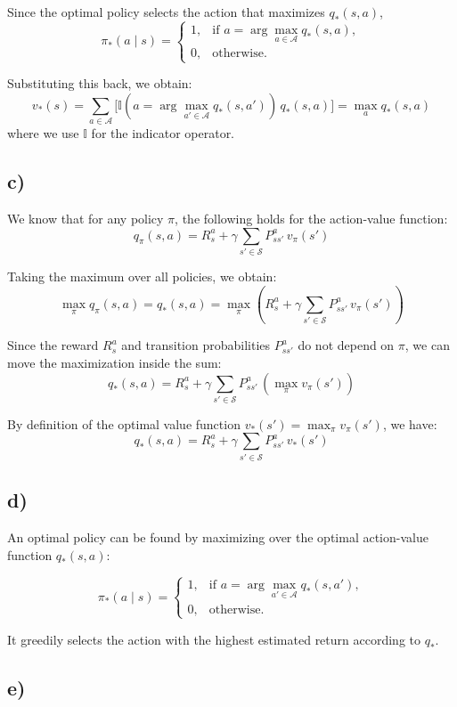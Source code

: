 \documentclass[11pt]{article}
\begin{document}
Since the optimal policy selects the action that maximizes $q_{*}(s,a)$,
\[
\pi_{*}(a \mid s) =
\begin{cases}
1, & \text{if } a = \arg\max\limits_{a \in \mathcal{A}} q_{*}(s,a), \\[4pt]
0, & \text{otherwise.}
\end{cases}
\]

Substituting this back, we obtain:
\[
v_{*}(s)
= \sum_{a \in \mathcal{A}}
\Big[ \mathbb{I}\!\left( a = \arg\max\limits_{a' \in \mathcal{A}} q_{*}(s,a') \right) 
\, q_{*}(s,a)\Big]
= \max_{a} q_{*}(s,a) 
\]
where we use $\mathbb{I}$ for the indicator operator.

\subsection*{c)}
We know that for any policy $\pi$, the following holds for the action-value function:
\[
q_{\pi}(s,a) = R_s^a + \gamma \sum_{s' \in \mathcal{S}} P_{ss'}^a \, v_{\pi}(s')
\]

Taking the maximum over all policies, we obtain:
\[
\max_{\pi} q_{\pi}(s,a) = q_{*}(s,a) = 
\max_{\pi} \left( R_s^a + \gamma \sum_{s' \in \mathcal{S}} P_{ss'}^a \, v_{\pi}(s') \right)
\]

Since the reward $R_s^a$ and transition probabilities $P_{ss'}^a$ do not depend on $\pi$, we can move the maximization inside the sum:
\[
q_{*}(s,a) = R_s^a + \gamma \sum_{s' \in \mathcal{S}} P_{ss'}^a \, \left( \max_{\pi} v_{\pi}(s') \right)
\]

By definition of the optimal value function $v_{*}(s') = \max_{\pi} v_{\pi}(s')$, we have:
\[
\boxed{
q_{*}(s,a) = R_s^a + \gamma \sum_{s' \in \mathcal{S}} P_{ss'}^a \, v_{*}(s')
}
\]

\subsection*{d)}
An optimal policy can be found by maximizing over the optimal action-value function $q_{*}(s,a)$:

\[
\pi_{*}(a \mid s) =
\begin{cases}
1, & \text{if } a = \arg\max\limits_{a' \in \mathcal{A}} q_{*}(s,a'), \\[6pt]
0, & \text{otherwise.}
\end{cases}
\]

\noindent
It greedily selects the action with the highest estimated return according to $q_{*}$.

\subsection*{e)}
\end{document}
